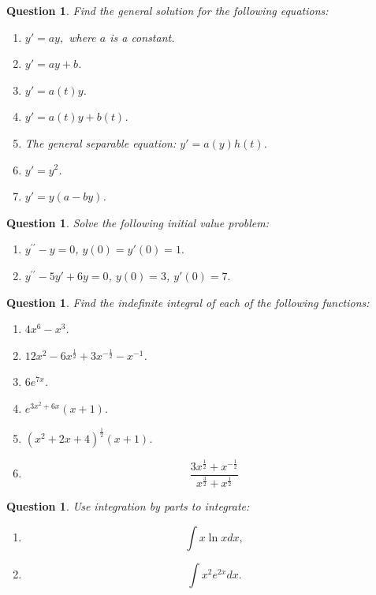 \documentclass[12pt]{article}
\newtheorem{ques}[theorem]{Question}
\begin{document}
\newpage
\begin{ques}
Find the general solution for the following equations:
 \begin{enumerate}
        \item $y'=ay,$ where $a$ is a constant.
        \item $y'=ay+b$.
        \item $y'=a(t)y$. 
        \item $y'=a(t)y+b(t)$.
        \item The general separable equation: $y'=a(y)h(t)$.
        \item $y'=y^2$. 
        \item $y'=y(a-by)$.
    \end{enumerate}
\end{ques}
\newpage
\begin{ques}
Solve the following initial value problem:
\begin{enumerate}
    \item $y^{\prime \prime}-y=0$, $y(0)=y'(0)=1.$
    \item $y^{\prime \prime}-5y'+6y=0$, $y(0)=3$, $y'(0)=7.$
\end{enumerate}
\end{ques}

\newpage
\begin{ques}
Find the indefinite integral of each of the following functions:
\begin{enumerate}
    \item $4x^6-x^3$.
    \item $12x^2-6x^{\frac{1}{2}}+3x^{-\frac{1}{2}}-x^{-1}$.
    \item $6e^{7x}$.
    \item $e^{3x^2+6x}(x+1)$.
    \item $(x^2+2x+4)^{\frac{1}{2}}(x+1)$.
    \item $$\frac{3x^{\frac{1}{2}}+x^{-\frac{1}{2}}}{x^{\frac{3}{2}}+x^{\frac{1}{2}}}$$
\end{enumerate}
\end{ques}
\newpage
\begin{ques}
Use integration by parts to integrate:
\begin{enumerate}
    \item \[\int x \ln xdx,
    \]
    \item \[\int x^2 e^{2x} dx.
    \]
\end{enumerate}
\end{ques}
\end{document}
